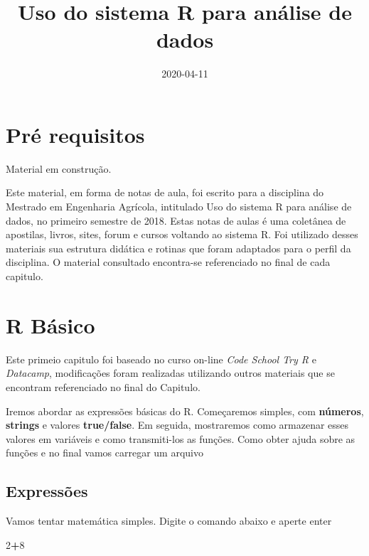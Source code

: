 \documentclass[
]{book}
\title{Uso do sistema R para análise de dados}
\author{}
\date{\vspace{-2.5em}2020-04-11}
\newenvironment{Shaded}{\begin{snugshade}}{\end{snugshade}}
\newcommand{\DecValTok}[1]{\textcolor[rgb]{0.00,0.00,0.81}{#1}}
\newcommand{\OperatorTok}[1]{\textcolor[rgb]{0.81,0.36,0.00}{\textbf{#1}}}
\begin{document}
\maketitle

{
\setcounter{tocdepth}{1}
\tableofcontents
}
\hypertarget{pruxe9-requisitos}{%
\chapter{Pré requisitos}\label{pruxe9-requisitos}}

Material em construção.

Este material, em forma de notas de aula, foi escrito para a disciplina do Mestrado em Engenharia Agrícola, intitulado Uso do sistema R para análise de dados, no primeiro semestre de 2018.
Estas notas de aulas é uma coletânea de apostilas, livros, sites, forum e cursos voltando ao sistema R. Foi utilizado desses materiais sua estrutura didática e rotinas que foram adaptados para o perfil da disciplina.
O material consultado encontra-se referenciado no final de cada capitulo.

\hypertarget{intro}{%
\chapter{R Básico}\label{intro}}

Este primeio capitulo foi baseado no curso on-line \emph{Code School Try R} e \emph{Datacamp}, modificações foram realizadas utilizando outros materiais que se encontram referenciado no final do Capitulo.

Iremos abordar as expressões básicas do R.
Começaremos simples, com \textbf{números}, \textbf{strings} e valores \textbf{true/false}. Em seguida, mostraremos como armazenar esses valores em variáveis e como transmiti-los as funções. Como obter ajuda sobre as funções e no final vamos carregar um arquivo

\hypertarget{expressuxf5es}{%
\section{Expressões}\label{expressuxf5es}}

Vamos tentar matemática simples. Digite o comando abaixo e aperte enter

\begin{Shaded}
\begin{Highlighting}[]
\DecValTok{2}\OperatorTok{+}\DecValTok{8}
\end{Highlighting}
\end{Shaded}
\end{document}
